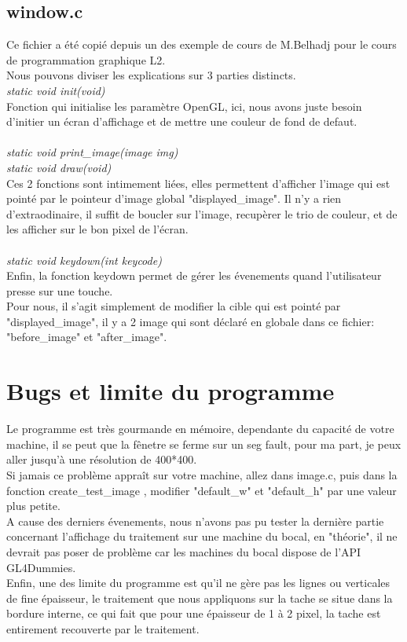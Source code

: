 \documentclass[12pt, letterpaper]{article}
\begin{document}
\subsection{window.c}
Ce fichier a été copié depuis un des exemple de cours de M.Belhadj pour le cours de programmation graphique L2.\\
Nous pouvons diviser les explications sur 3 parties distincts. \\
\textit{static void init(void)}\\
Fonction qui initialise les paramètre OpenGL, ici, nous avons juste besoin d'initier un écran d'affichage 
et de mettre une couleur de fond de defaut.\\\\
\textit{static void print\_image(image img)}\\
\textit{static void draw(void)}\\
Ces 2 fonctions sont intimement liées, elles permettent d'afficher l'image qui est pointé par le pointeur d'image global 
"displayed\_image". Il n'y a rien d'extraodinaire, il suffit de boucler sur l'image, recupèrer le trio de couleur, et de les afficher sur le bon pixel de l'écran.\\ 
\\
\textit{static void keydown(int keycode)}\\
Enfin, la fonction keydown permet de gérer les évenements quand l'utilisateur presse sur une touche.\\
Pour nous, il s'agit simplement de modifier la cible qui est pointé par "displayed\_image", il y a 2 image qui sont déclaré en globale 
dans ce fichier: "before\_image" et "after\_image".\\

\section{Bugs et limite du programme}
Le programme est très gourmande en mémoire, dependante du capacité de votre machine, il se peut 
que la fênetre se ferme sur un seg fault, pour ma part, je peux aller jusqu'à une résolution de 400*400.\\
Si jamais ce problème appraît sur votre machine, allez dans image.c, puis dans la fonction 
create\_test\_image , modifier "default\_w" et "default\_h" par une valeur plus petite.\\ 
A cause des derniers évenements, nous n'avons pas pu tester la dernière partie concernant l'affichage du traitement 
sur une machine du bocal, en "théorie", il ne devrait pas poser de problème car les machines du bocal dispose de l'API GL4Dummies.\\
Enfin, une des limite du programme est qu'il ne gère pas les lignes ou verticales de fine épaisseur, 
le traitement que nous appliquons sur la tache se situe dans la bordure interne, ce qui fait que pour une épaisseur de 1 à 2 pixel, 
la tache est entirement recouverte par le traitement. 
\end{document}
